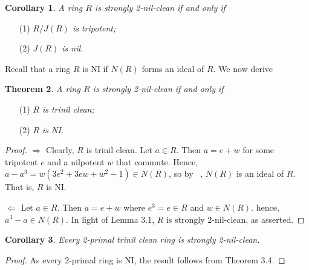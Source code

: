 \documentclass[12pt, reqno]{amsart}
\newtheorem{thm}{Theorem}[section]
\newtheorem{cor}[thm]{Corollary}
\numberwithin{equation}{section}
\begin{document}
\begin{cor} A ring $R$ is strongly 2-nil-clean if and only if
\end{cor}
\begin{enumerate}
\item [(1)]{\it $R/J(R)$ is tripotent;}
\vspace{-.5mm}
\item [(2)]{\it $J(R)$ is nil.}
\end{enumerate}

\vskip4mm Recall that a ring $R$ is NI if $N(R)$ forms an ideal of $R$. We now derive

\begin{thm} A ring $R$ is strongly 2-nil-clean if and only if
\end{thm}
\begin{enumerate}
\item [(1)]{\it $R$ is trinil clean;}
\vspace{-.5mm}
\item [(2)]{\it $R$ is NI.}
\end{enumerate}
\begin{proof} $\Longrightarrow $ Clearly, $R$ is trinil clean. Let $a\in R$. Then $a=e+w$ for some tripotent $e$ and a nilpotent $w$ that commute. Hence, $a-a^3=w(3e^2+3ew+w^2-1)\in N(R)$, so by ~\cite[ Theorem A1]{HT}, $N(R)$ is an ideal of $R$. That is, $R$ is NI.

$\Longleftarrow$ Let $a\in R$. Then $a=e+w$ where $e^3=e\in R$ and $w\in N(R)$. hence, $a^3-a\in N(R)$. In light of Lemma 3.1,
$R$ is strongly 2-nil-clean, as asserted.\end{proof}

\begin{cor} Every 2-primal trinil clean ring is strongly 2-nil-clean.
\end{cor}
\begin{proof} As every 2-primal ring is NI, the result follows from Theorem 3.4.\end{proof}
\end{document}
